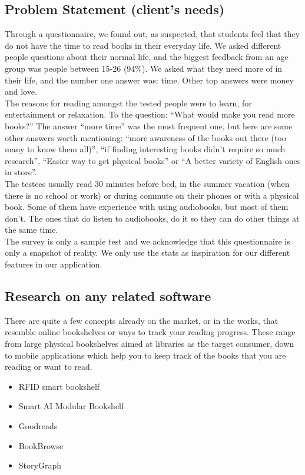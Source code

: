 \documentclass[conference]{IEEEtran}
\begin{document}
\subsection*{Problem Statement (client's needs)}
Through a questionnaire, we found out, as suspected, that students feel that they do not have the time to read books in their everyday life. We asked different people questions about their normal life, and the biggest feedback from an age group was people between 15-26 (94\%). We asked what they need more of in their life, and the number one answer was: time. Other top answers were money and love.\\
The reasons for reading amongst the tested people were to learn, for entertainment or relaxation. To the question: “What would make you read more books?” The answer “more time” was the most frequent one, but here are some other answers worth mentioning: “more awareness of the books out there (too many to know them all)”, “if finding interesting books didn’t require so much research”, “Easier way to get physical books” or “A better variety of English ones in store”.\\
The testees usually read 30 minutes before bed, in the summer vacation (when there is no school or work) or during commute on their phones or with a physical book. Some of them have experience with using audiobooks, but most of them don't. The ones that do listen to audiobooks, do it so they can do other things at the same time.\\
The survey is only a sample test and we acknowledge that this questionnaire is only a snapshot of reality. We only use the stats as inspiration for our different features in our application.


\subsection*{Research on any related software}
There are quite a few concepts already on the market, or in the works, that resemble online bookshelves or ways to track your reading progress. These range from large physical bookshelves aimed at libraries as the target consumer, down to mobile applications which help you to keep track of the books that you are reading or want to read.
\begin{itemize}
	\item RFID smart bookshelf
	\item Smart AI Modular Bookshelf
	\item Goodreads
	\item BookBrowse
	\item StoryGraph
\end{itemize}
\end{document}
